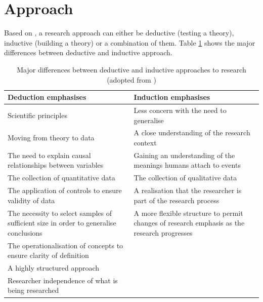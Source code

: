
\section{Approach}

Based on \cite{Saunders2009}, a research approach can either be deductive (testing a theory), inductive (building a theory) or a combination of them. Table \ref{tbl:inductivedeductive} shows the major differences between deductive and inductive approach.
\begin{table}[h!]
	\begin{center}
		\begin{tabular}{ p{6.5cm} p{7.5cm} }
			\toprule
			\textbf{Deduction emphasises} & \textbf{Induction emphasises} \\
			\midrule
			Scientific principles & Less concern with the need to generalise \\
			Moving from theory to data & A close understanding of the research context  \\
			The need to explain causal relationships between variables & Gaining an understanding of the meanings humans attach to events \\
			The collection of quantitative data & The collection of qualitative data \\
			The application of controls to ensure validity of data & A realisation that the researcher is part of the research process \\
			The necessity to select samples of sufficient size in order to generalise conclusions & A more flexible structure to permit changes of research emphasis as the research progresses \\
			The operationalisation of concepts to ensure clarity of definition & \\
			A highly structured approach & \\
			Researcher independence of what is being researched & \\
			\bottomrule
		\end{tabular}
		\caption[Major differences between deductive and inductive approaches to research]{Major differences between deductive and inductive approaches to research (adopted from {\citealp[pg. 127]{Saunders2009}})}
		\label{tbl:inductivedeductive}
	\end{center}
\end{table} \newline
